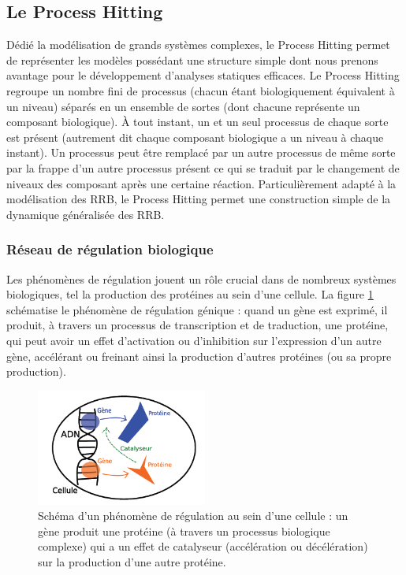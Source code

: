 \subsection{Le Process Hitting }

Dédié la modélisation de grands systèmes complexes, le Process Hitting permet de représenter les modèles possédant une structure simple dont nous prenons avantage pour le développement d’analyses statiques efficaces. Le Process Hitting regroupe un nombre fini de processus (chacun étant biologiquement équivalent à un niveau) séparés en un ensemble de sortes (dont chacune représente un composant biologique). À tout instant, un et un seul processus de chaque sorte est présent (autrement dit chaque composant biologique a un niveau à chaque instant). Un processus peut être remplacé par un autre processus de même sorte par la frappe d’un autre processus présent ce qui se traduit par le changement de niveaux des composant après une certaine réaction. Particulièrement adapté à la modélisation des RRB, le Process Hitting permet une construction simple de la
dynamique généralisée des RRB.

\subsubsection{Réseau de régulation biologique }
Les phénomènes de régulation jouent un rôle crucial dans de nombreux systèmes biologiques,
tel la production des protéines au sein d’une cellule. La figure \ref{cellule} schématise le phénomène de
régulation génique : quand un gène est exprimé, il produit, à travers un processus de transcription
et de traduction, une protéine, qui peut avoir un effet d’activation ou d’inhibition sur l’expression d’un
autre gène, accélérant ou freinant ainsi la production d’autres protéines (ou sa propre production).\\
\begin{figure}[!ht]
    \center
    \includegraphics[width=0.5\textwidth]{./images/cellule.png}
    \caption{Schéma d’un phénomène de régulation au sein d’une cellule \cite{pauleve2011modelisation} : un gène produit une
protéine (à travers un processus biologique complexe) qui a un effet de catalyseur (accélération ou
décélération) sur la production d’une autre protéine.}
    \label{cellule}
\end{figure}

